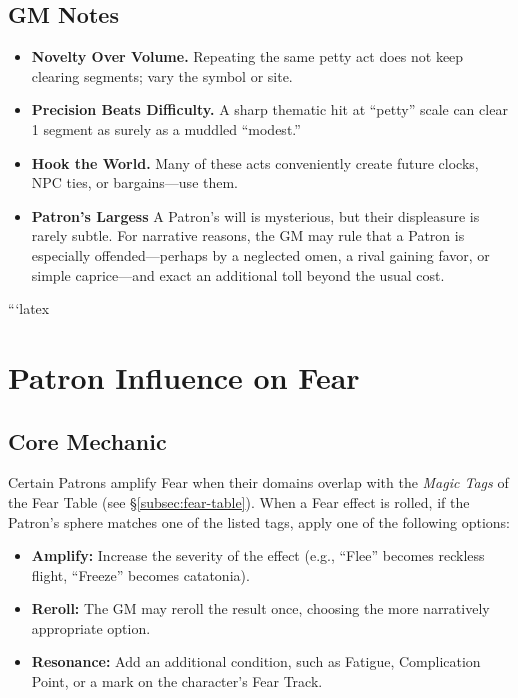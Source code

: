\subsection*{GM Notes}\label{subsec:acts-service-gm}
\begin{itemize}
\item \textbf{Novelty Over Volume.} Repeating the same petty act does not keep clearing segments; vary the symbol or site.
\item \textbf{Precision Beats Difficulty.} A sharp thematic hit at “petty” scale can clear 1 segment as surely as a muddled “modest.”
\item \textbf{Hook the World.} Many of these acts conveniently create future clocks, NPC ties, or bargains—use them.
\item \textbf{Patron’s Largess} A Patron’s will is mysterious, but their displeasure is rarely subtle. For narrative reasons, the GM may rule that a Patron is especially offended—perhaps by a neglected omen, a rival gaining favor, or simple caprice—and exact an additional toll beyond the usual cost.
\end{itemize}

```latex
\section{Patron Influence on Fear}
\label{sec:patron-fear-influence}

\subsection{Core Mechanic}
\label{subsec:patron-fear-core}

Certain Patrons amplify Fear when their domains overlap with the \emph{Magic Tags} of the Fear Table (see \S\ref{subsec:fear-table}).  
When a Fear effect is rolled, if the Patron's sphere matches one of the listed tags, apply one of the following options:

\begin{itemize}
  \item \textbf{Amplify:} Increase the severity of the effect (e.g., ``Flee'' becomes reckless flight, ``Freeze'' becomes catatonia).
  \item \textbf{Reroll:} The GM may reroll the result once, choosing the more narratively appropriate option.
  \item \textbf{Resonance:} Add an additional condition, such as Fatigue, Complication Point, or a mark on the character's Fear Track.
\end{itemize}

